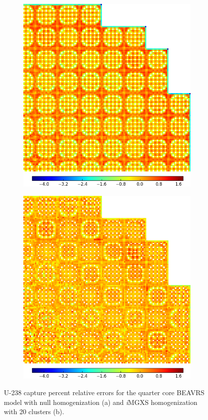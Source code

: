 \documentclass[12pt,twoside]{mitthesis-exec}
\begin{document}
\begin{figure}[h!]
\centering
\begin{subfigure}{0.9\textwidth}
  \centering
  \includegraphics[width=0.65\linewidth]{figures/results/capt-to-fiss/spatial/full-core/capt-to-fiss-err-null}
  \caption{}
  \label{fig:chap11-full-core-capt-err-null}
\end{subfigure}
\begin{subfigure}{0.9\textwidth}
  \centering
\includegraphics[width=0.65\linewidth]{figures/results/capt-to-fiss/spatial/full-core/capt-to-fiss-err-birch-40}
  \caption{}
  \label{fig:chap11-full-core-capt-err-birch-40}
\end{subfigure}
\caption[U-238 capture rate errors for BEAVRS]{U-238 capture percent relative errors for the quarter core BEAVRS model with null homogenization (a) and \textit{i}MGXS homogenization with 20 clusters (b).}
\label{fig:chap11-full-core-capt-err-b}
\end{figure}
\end{document}
